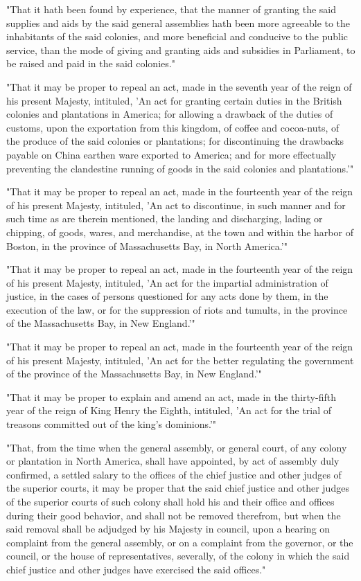 "That it hath been found by experience, that the manner of granting the said supplies and aids by the said general assemblies hath been more agreeable to the inhabitants of the said colonies, and more beneficial and conducive to the public service, than the mode of giving and granting aids and subsidies in Parliament, to be raised and paid in the said colonies."

"That it may be proper to repeal an act, made in the seventh year of the reign of his present Majesty, intituled, 'An act for granting certain duties in the British colonies and plantations in America; for allowing a drawback of the duties of customs, upon the exportation from this kingdom, of coffee and cocoa-nuts, of the produce of the said colonies or plantations; for discontinuing the drawbacks payable on China earthen ware exported to America; and for more effectually preventing the clandestine running of goods in the said colonies and plantations.'"

"That it may be proper to repeal an act, made in the fourteenth year of the reign of his present Majesty, intituled, 'An act to discontinue, in such manner and for such time as are therein mentioned, the landing and discharging, lading or chipping, of goods, wares, and merchandise, at the town and within the harbor of Boston, in the province of Massachusetts Bay, in North America.'"

"That it may be proper to repeal an act, made in the fourteenth year of the reign of his present Majesty, intituled, 'An act for the impartial administration of justice, in the cases of persons questioned for any acts done by them, in the execution of the law, or for the suppression of riots and tumults, in the province of the Massachusetts Bay, in New England.'"

"That it may be proper to repeal an act, made in the fourteenth year of the reign of his present Majesty, intituled, 'An act for the better regulating the government of the province of the Massachusetts Bay, in New England.'"

"That it may be proper to explain and amend an act, made in the thirty-fifth year of the reign of King Henry the Eighth, intituled, 'An act for the trial of treasons committed out of the king's dominions.'"

"That, from the time when the general assembly, or general court, of any colony or plantation in North America, shall have appointed, by act of assembly duly confirmed, a settled salary to the offices of the chief justice and other judges of the superior courts, it may be proper that the said chief justice and other judges of the superior courts of such colony shall hold his and their office and offices during their good behavior, and shall not be removed therefrom, but when the said removal shall be adjudged by his Majesty in council, upon a hearing on complaint from the general assembly, or on a complaint from the governor, or the council, or the house of representatives, severally, of the colony in which the said chief justice and other judges have exercised the said offices."

